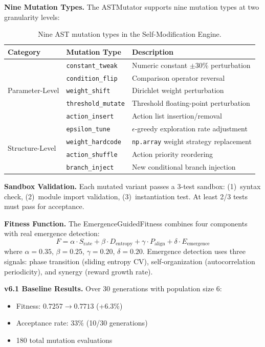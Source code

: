 \documentclass[11pt]{article}
\begin{document}
\textbf{Nine Mutation Types.} The ASTMutator supports nine mutation types at two granularity levels:

\begin{table}[h]
\centering
\small
\begin{tabular}{lll}
\toprule
\textbf{Category} & \textbf{Mutation Type} & \textbf{Description} \\
\midrule
\multirow{5}{*}{Parameter-Level} & \texttt{constant\_tweak} & Numeric constant $\pm$30\% perturbation \\
 & \texttt{condition\_flip} & Comparison operator reversal \\
 & \texttt{weight\_shift} & Dirichlet weight perturbation \\
 & \texttt{threshold\_mutate} & Threshold floating-point perturbation \\
 & \texttt{action\_insert} & Action list insertion/removal \\
\midrule
\multirow{4}{*}{Structure-Level} & \texttt{epsilon\_tune} & $\epsilon$-greedy exploration rate adjustment \\
& \texttt{weight\_hardcode} & \texttt{np.array} weight strategy replacement \\
& \texttt{action\_shuffle} & Action priority reordering \\
& \texttt{branch\_inject} & New conditional branch injection \\
\bottomrule
\end{tabular}
\caption{Nine AST mutation types in the Self-Modification Engine.}
\label{tab:mutations}
\end{table}

\textbf{Sandbox Validation.} Each mutated variant passes a 3-test sandbox: (1)~syntax check, (2)~module import validation, (3)~instantiation test. At least 2/3 tests must pass for acceptance.

\textbf{Fitness Function.} The EmergenceGuidedFitness combines four components with real emergence detection:
\begin{equation}
F = \alpha \cdot S_{\text{rate}} + \beta \cdot D_{\text{entropy}} + \gamma \cdot P_{\text{align}} + \delta \cdot E_{\text{emergence}}
\end{equation}
where $\alpha=0.35$, $\beta=0.25$, $\gamma=0.20$, $\delta=0.20$. Emergence detection uses three signals: phase transition (sliding entropy CV), self-organization (autocorrelation periodicity), and synergy (reward growth rate).

\textbf{v6.1 Baseline Results.} Over 30 generations with population size 6:
\begin{itemize}
    \item Fitness: $0.7257 \to 0.7713$ (+6.3\%)
    \item Acceptance rate: 33\% (10/30 generations)
    \item 180 total mutation evaluations
\end{itemize}
\end{document}
